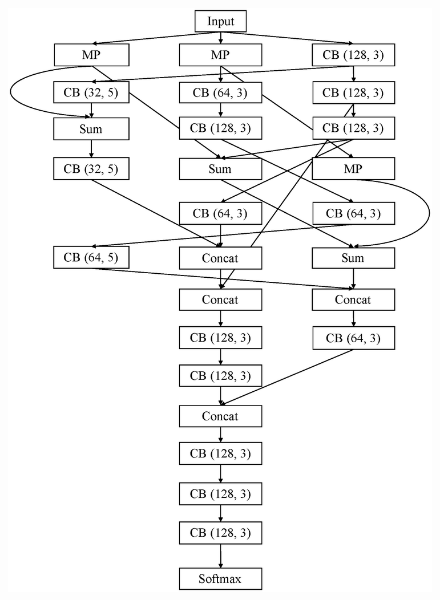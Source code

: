 \begin{figure}[!t]
 \begin{minipage}[b]{0.45\linewidth}
  \centering
  \includegraphics[keepaspectratio, scale=0.4]{images/modelA.eps}
  \label{modelA}
 \end{minipage}
 \begin{minipage}[b]{0.45\linewidth}
  \centering

\end{minipage}
\end{figure}
